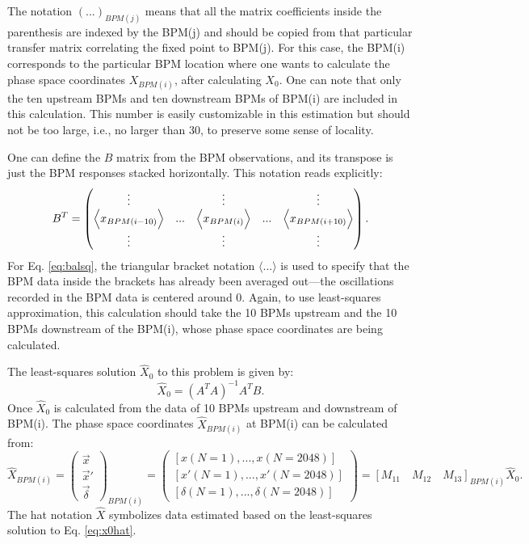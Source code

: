 The notation $(...)_{BPM(j)}$ means that all the matrix coefficients inside the parenthesis are indexed by the BPM(j) and should be copied from that particular transfer matrix correlating the fixed point to BPM(j). For this case, the BPM(i) corresponds to the particular BPM location where one wants to calculate the phase space coordinates $X_{BPM(i)}$, after calculating $X_0$. One can note that only the ten upstream BPMs and ten downstream BPMs of BPM(i) are included in this calculation. This number is easily customizable in this estimation but should not be too large, i.e., no larger than 30, to preserve some sense of locality. 

One can define the $B$ matrix from the BPM observations, and its transpose is just the BPM responses stacked horizontally. This notation reads explicitly:
\begin{equation}
    \label{eq:balsq}
    B^T =
    \begin{pmatrix}
    \vdots & & \vdots & & \vdots \\
    \Bigl< x_{BPM(i-10)} \Bigr> & ... &  \Bigl< x_{BPM(i)} \Bigr> &  ... & \Bigl< x_{BPM(i+10)} \Bigr> \\
    \vdots & & \vdots & & \vdots \\
    \end{pmatrix}. 
\end{equation}
For Eq. \ref{eq:balsq}, the triangular bracket notation $\langle ... \rangle$ is used to specify that the BPM data inside the brackets has already been averaged out---the oscillations recorded in the BPM data is centered around 0. Again, to use least-squares approximation, this calculation should take the 10 BPMs upstream and the 10 BPMs downstream of the BPM(i), whose phase space coordinates are being calculated. 

The least-squares solution $\hat{X}_0$ to this problem is given by:
\begin{equation}
    \label{eq:x0hat}
    \hat{X}_0 = (A^T A)^{-1} A^T B.
\end{equation}
Once $\hat{X}_0$ is calculated from the data of 10 BPMs upstream and downstream of BPM(i). The phase space coordinates $\hat{X}_{BPM(i)}$ at BPM(i) can be calculated from:
\begin{equation}
    \label{eq:xbpmi}
    \hat{X}_{BPM(i)} = \begin{pmatrix}
        \vec{x} \\
        \vec{x}' \\
        \vec{\delta}
    \end{pmatrix}_{BPM(i)}=
    \begin{pmatrix}
        \left[ x(N=1),...,x(N=2048) \right] \\
        \left[ x'(N=1),..., x'(N=2048) \right] \\
        \left[ \delta (N=1),..., \delta (N=2048) \right]
    \end{pmatrix}
    = \left[ M_{11} \quad M_{12} \quad M_{13} \right]_{BPM(i)} \hat{X}_0.  
\end{equation}
The hat notation $\hat{X}$ symbolizes data estimated based on the least-squares solution to Eq. \ref{eq:x0hat}. 

